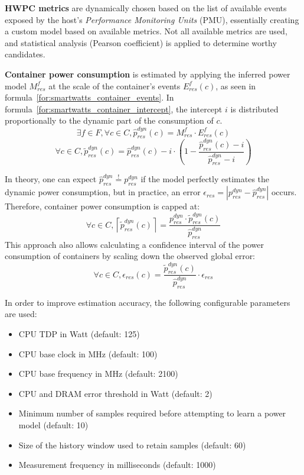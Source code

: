 \textbf{HWPC metrics} are dynamically chosen based on the list of available events exposed by the host's \textit{Performance Monitoring Units} (PMU), essentially creating a custom model based on available metrics. Not all available metrics are used, and statistical analysis (Pearson coefficient) is applied to determine worthy candidates.

\textbf{Container power consumption} is estimated by applying the inferred power model $M_{res}^{f}$ at the scale of the container's events $E_{res}^{f}(c)$, as seen in formula~\ref{for:smartwatts_container_events}. In formula~\ref{for:smartwatts_container_intercept}, the intercept $i$ is distributed proportionally to the dynamic part of the consumption of $c$.
\begin{equation}
\label{for:smartwatts_container_events}
    \exists f \in F, \forall c \in C, \hat{p}_{res}^{dyn}(c) = M_{res}^{f} \cdot E_{res}^{f}(c)
\end{equation}
\begin{equation}
\label{for:smartwatts_container_intercept}
    \forall c \in C, \tilde{p}_{res}^{dyn}(c) = \hat{p}_{res}^{dyn}(c) - i \cdot \left(1 - \frac{\hat{p}_{res}^{dyn}(c) - i}{\hat{p}_{res}^{dyn} - i}\right)
\end{equation}

In theory, one can expect $\hat{p}_{res}^{dyn} \overset{!}{=} {p}_{res}^{dyn}$ if the model perfectly estimates the dynamic power consumption, but in practice, an error $\epsilon_{res} = \left| {p}_{res}^{dyn} - \hat{p}_{res}^{dyn} \right|$ occurs. Therefore, container power consumption is capped at:
\begin{equation}
    \forall c \in C, \left\lceil \tilde{p}_{res}^{dyn}(c) \right\rceil = \frac{{p}_{res}^{dyn} \cdot \tilde{p}_{res}^{dyn}(c)}{\hat{p}_{res}^{dyn}}
\end{equation}
This approach also allows calculating a confidence interval of the power consumption of containers by scaling down the observed global error:
\begin{equation}
    \forall c \in C, \epsilon_{res}(c) = \frac{\tilde{p}_{res}^{dyn}(c)}{\hat{p}_{res}^{dyn}} \cdot \epsilon_{res}
\end{equation}

In order to improve estimation accuracy, the following configurable parameters are used:
\begin{itemize}
    \item CPU TDP in Watt (default: 125)
    \item CPU base clock in MHz (default: 100)
    \item CPU base frequency in MHz (default: 2100)
    \item CPU and DRAM error threshold in Watt (default: 2)
    \item Minimum number of samples required before attempting to learn a power model (default: 10)
    \item Size of the history window used to retain samples (default: 60)
    \item Measurement frequency in milliseconds (default: 1000)
\end{itemize}

